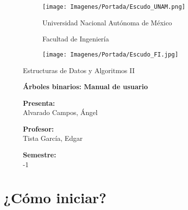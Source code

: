 \documentclass[letterpaper, 11pt]{article}
\begin{document}
	
	\begin{figure}[H] %
		\begin{subfigure}{0.2\textwidth}
			\texttt{[image: Imagenes/Portada/Escudo\_UNAM.png]}
		\end{subfigure}
		\hfill
		\begin{subfigure}{0.5\textwidth}
			\centering
			{\fontsize{15}{15} \selectfont Universidad Nacional Autónoma de México}
			
			\vspace{6mm}
			
			{\fontsize{15}{15} \selectfont Facultad de Ingeniería}
		\end{subfigure}
		\hfill
		\begin{subfigure}{0.2\textwidth}
			\texttt{[image: Imagenes/Portada/Escudo\_FI.jpg]}
		\end{subfigure}
		
		\vspace{15mm}
		
		\centering
		{\fontsize{18}{18} \selectfont Estructuras de Datos y Algoritmos II}
		
		\vspace{25mm}
		
		{\fontsize{18}{18} \selectfont \textbf{Árboles binarios: Manual de usuario}}
		
		\vspace{20mm}
		
		{\fontsize{15}{15} \selectfont \textbf{Presenta:}}\\
		{\fontsize{15}{15} \selectfont Alvarado Campos, Ángel}\\
		
		\vspace{25mm}
		
		{\fontsize{15}{15} \selectfont \textbf{Profesor:}}\\
		{\fontsize{15}{15} \selectfont Tista García, Edgar}\\
		
		\vspace{25mm}
		
		{\fontsize{15}{15} \selectfont \textbf{Semestre:}}\\
		{\fontsize{15}{15} -1}\\
	\end{figure} %
	
	\newpage
	
	\section{¿Cómo iniciar?}
	
\end{document}
